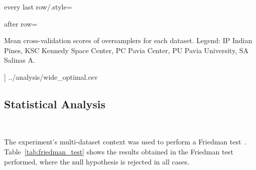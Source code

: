 \documentclass[remotesensing,article,submit,moreauthors,pdftex]{Definitions/mdpi}
\begin{document}
	every last row/.style={after row=\bottomrule
			\caption{\label{tab:cross_validation_scores}Mean cross-validation scores of oversamplers
        for each dataset. Legend: IP \- Indian Pines, KSC \- Kennedy Space Center, PC \- Pavia Center,
        PU \- Pavia University, SA \- Salinas A.}}
]
{../analysis/wide_optimal.csv}
\begin{paracol}{2}
\linenumbers
\switchcolumn

\subsection{Statistical Analysis}~\label{sec:statistical_analysis}

The experiment's multi-dataset context was used to perform a Friedman
test~\cite{friedman1937use}. Table~\ref{tab:friedman_test} shows the results
obtained in the Friedman test performed, where the null hypothesis is rejected
in all cases.

\end{paracol}
\end{document}
